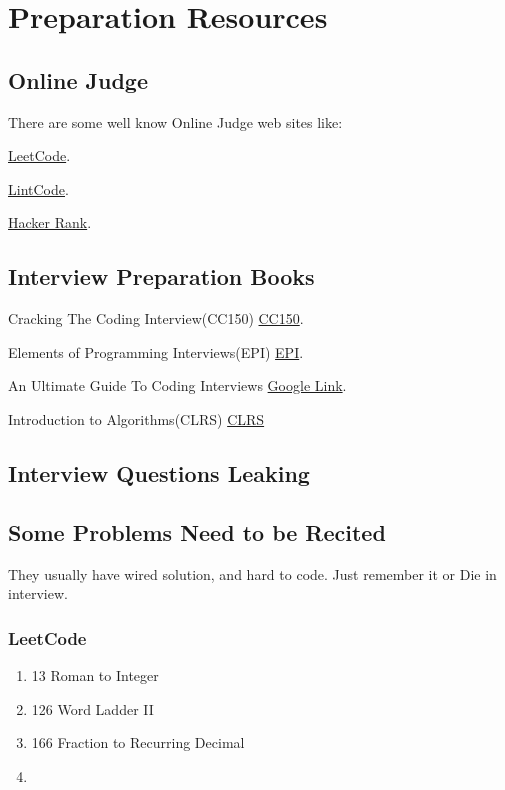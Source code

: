 \chapter{Preparation Resources}




\section{Online Judge }

There are some well know Online Judge web sites like:


\href{http://leetcode.com/problemset/}{LeetCode}.

\href{http://www.lintcode.com/en/problem/}{LintCode}.

\href{http://www.hackerrank.com/}{Hacker Rank}.

\section{Interview Preparation Books }

Cracking The Coding Interview(CC150)
\href{http://www.amazon.com/Cracking-Coding-Interview-Programming-Questions/dp/098478280X}{CC150}.

Elements of Programming Interviews(EPI)
\href{http://www.amazon.com/Elements-Programming-Interviews-Insiders-Guide/dp/1479274836}{EPI}.

An Ultimate Guide To Coding Interviews
\href{https://play.google.com/store/books/details?id=XDoVCAAAQBAJ&rdid=book-XDoVCAAAQBAJ&rdot=1&source=gbs_vpt_read&pcampaignid=books_booksearch_viewport}{Google Link}.

Introduction to Algorithms(CLRS)
\href{http://mitpress.mit.edu/books/introduction-algorithms}{CLRS}



\section{Interview Questions Leaking }



\section{Some Problems Need to be Recited }
They usually have wired solution, and hard to code. Just remember it or Die in interview. 
\subsection{ LeetCode }
\begin{enumerate}
    \item 13   Roman to Integer
    \item 126  Word Ladder II 
    \item 166  Fraction to Recurring Decimal
    \item  
\end{enumerate}

